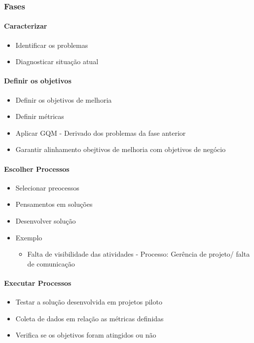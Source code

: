 \documentclass{article}
\begin{document}
\subsubsection{Fases}
\paragraph{Caracterizar}

	\begin{itemize}
	\item Identificar os problemas
	\item Diagnosticar situação atual
	
	\end{itemize}
\paragraph{Definir os objetivos}

	\begin{itemize}
	\item Definir os objetivos de melhoria
	\item Definir métricas
	\item Aplicar GQM - Derivado dos problemas da fase anterior
	\item Garantir alinhamento obejtivos de melhoria com objetivos de negócio	
	\end{itemize}
\paragraph{Escolher Processos}

	\begin{itemize}
	\item Selecionar preocessos
	\item Pensamentos em soluções
	\item Desenvolver solução
	\item Exemplo
		\begin{itemize}
		\item Falta de visibilidade das atividades - Processo: Gerência de projeto/ falta de comunicação
		\end{itemize}
	\end{itemize}
\paragraph{Executar Processos}

	\begin{itemize}	
	\item Testar a solução desenvolvida em projetos piloto
	\item Coleta de dados em relação as métricas definidas
	\item Verifica se os objetivos foram atingidos ou não
	\end{itemize}
\end{document}
